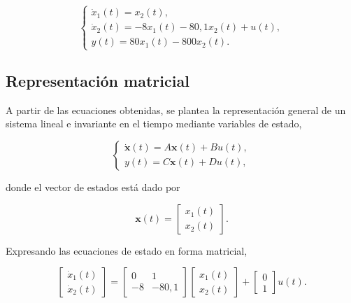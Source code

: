 \documentclass[10pt]{article}
\begin{document}
\begin{equation}
    \boxed{
        \begin{cases}
            \dot{x}_1(t)=x_2(t),\\
            \dot{x}_2(t)=-8x_1(t)-80{,}1x_2(t)+u(t),\\
            y(t)=80x_1(t)-800x_2(t).
        \end{cases}
    }
    \label{eq:ej6_estados}
\end{equation}


\subsection{Representación matricial}

A partir de las ecuaciones obtenidas, se plantea
la representación general de un sistema lineal e
invariante en el tiempo mediante variables de estado,

\begin{equation}
    \begin{cases}
        \dot{\mathbf{x}}(t)=A\mathbf{x}(t)+Bu(t),\\
        y(t)=C\mathbf{x}(t)+Du(t),
    \end{cases}
\end{equation}

donde el vector de estados está dado por

\begin{equation}
    \mathbf{x}(t)=
    \begin{bmatrix}
        x_1(t)\\
        x_2(t)
    \end{bmatrix}.
\end{equation}

Expresando las ecuaciones de estado en forma matricial,

\begin{equation}
    \begin{bmatrix}
        \dot{x}_1(t)\\
        \dot{x}_2(t)
    \end{bmatrix}
    =
    \begin{bmatrix}
        0 & 1\\
        -8 & -80{,}1
    \end{bmatrix}
    \begin{bmatrix}
        x_1(t)\\
        x_2(t)
    \end{bmatrix}
    +
    \begin{bmatrix}
        0\\
        1
    \end{bmatrix}u(t).
\end{equation}
\end{document}
